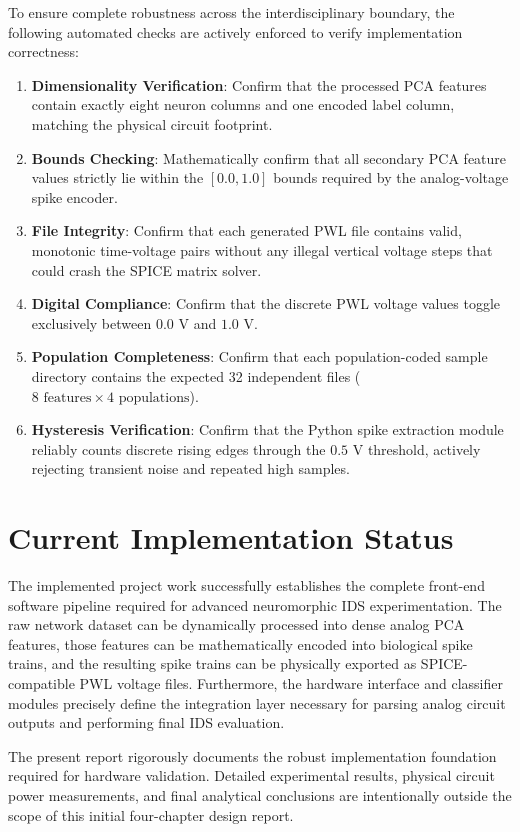 To ensure complete robustness across the interdisciplinary boundary, the following automated checks are actively enforced to verify implementation correctness:
\begin{enumerate}
\item \textbf{Dimensionality Verification}: Confirm that the processed PCA features contain exactly eight neuron columns and one encoded label column, matching the physical circuit footprint.
\item \textbf{Bounds Checking}: Mathematically confirm that all secondary PCA feature values strictly lie within the $[0.0, 1.0]$ bounds required by the analog-voltage spike encoder.
\item \textbf{File Integrity}: Confirm that each generated PWL file contains valid, monotonic time-voltage pairs without any illegal vertical voltage steps that could crash the SPICE matrix solver.
\item \textbf{Digital Compliance}: Confirm that the discrete PWL voltage values toggle exclusively between $0.0\text{ V}$ and $1.0\text{ V}$.
\item \textbf{Population Completeness}: Confirm that each population-coded sample directory contains the expected 32 independent files ($8 \text{ features} \times 4 \text{ populations}$).
\item \textbf{Hysteresis Verification}: Confirm that the Python spike extraction module reliably counts discrete rising edges through the $0.5\text{ V}$ threshold, actively rejecting transient noise and repeated high samples.
\end{enumerate}

\section{Current Implementation Status}

The implemented project work successfully establishes the complete front-end software pipeline required for advanced neuromorphic IDS experimentation. The raw network dataset can be dynamically processed into dense analog PCA features, those features can be mathematically encoded into biological spike trains, and the resulting spike trains can be physically exported as SPICE-compatible PWL voltage files. Furthermore, the hardware interface and classifier modules precisely define the integration layer necessary for parsing analog circuit outputs and performing final IDS evaluation.

The present report rigorously documents the robust implementation foundation required for hardware validation. Detailed experimental results, physical circuit power measurements, and final analytical conclusions are intentionally outside the scope of this initial four-chapter design report.
